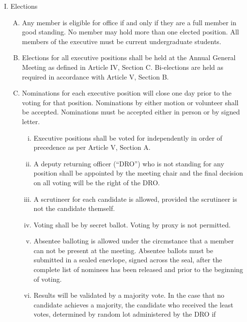 \documentclass[11pt]{article}
\begin{document}
\begin{enumerate}[I.]
\begin{enumerate}[A)]
\begin{enumerate}[i)]
\begin{enumerate}[a)]
            \end{enumerate}
        \end{enumerate}
    \end{enumerate}
  \item Elections
    \begin{enumerate}[A)]
      \item Any member is eligible for office if and only if they are a full
        member in good standing. No member may hold more than one elected
        position. All members of the executive must be current undergraduate
        students.
      \item Elections for all executive positions shall be held at the Annual
        General Meeting as defined in Article IV, Section C. Bi-elections are
        held as required in accordance with Article V, Section B.
      \item  Nominations for each executive position will close one day prior
        to the voting for that position. Nominations by either motion or
        volunteer shall be accepted. Nominations must be accepted either in
        person or by signed letter.
        \begin{enumerate}[i)]
          \item Executive positions shall be voted for independently in order
            of precedence as per Article V, Section A.
          \item A deputy returning officer (``DRO'') who is not standing for
            any position shall be appointed by the meeting chair and the final
            decision on all voting will be the right of the DRO.
          \item A scrutineer for each candidate is allowed, provided the
            scrutineer is not the candidate themself.
          \item Voting shall be by secret ballot. Voting by proxy is not
            permitted.
          \item Absentee balloting is allowed under the circmstance that a
            member can not be present at the meeting. Absentee ballots must be
            submitted in a sealed enevlope, signed across the seal, after the
            complete list of nominees has been released and prior to the
            beginning of voting.
          \item Results will be validated by a majority vote. In the case that
            no candidate achieves a majority, the candidate who received the
            least votes, determined by random lot administered by the DRO if

\end{enumerate}
\end{enumerate}
\end{enumerate}
\end{document}
